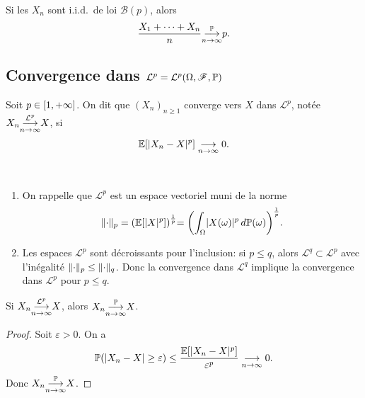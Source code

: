 \begin{example}
    Si les \(X_n\) sont i.i.d.\ de loi \(\mathcal B(p)\), alors
    \begin{equation*}
        \frac{X_1 + \cdots + X_n}{n} \underset{n\to\infty}{{\overset{\mathbb{P}}{\longrightarrow}}} p.
    \end{equation*}
\end{example}

\subsection{Convergence dans \(\mathcal L^p = \mathcal L^p(\Omega, \mathscr{F}, \mathbb{P})\)} %

\begin{definition}
    Soit \(p \in \mathopen{}\left[1, +\infty\right]\mathclose{}\). On dit que \({(X_n)}_{n\geq 1}\)
    converge vers \(X\) dans \(\mathcal L^p\), notée \(X_n \underset{n\to\infty}{{\overset{\mathcal{L}^{p}}{\longrightarrow}}} X\),
    si
    \begin{equation*}
        \mathbb{E}[\mathopen{}\left|X_n - X\right|\mathclose{}^p] \underset{n\to\infty}{\longrightarrow} 0.
    \end{equation*}
\end{definition}

\begin{remark}\,\\
    \begin{enumerate}
        \item 
        On rappelle que \(\mathcal L^p\) est un espace vectoriel
        muni de la norme
        \begin{equation*}
            \mathopen{}\left\|\cdot\right\|\mathclose{}_p = {\left(\mathbb{E}[\mathopen{}\left|X\right|\mathclose{}^p]\right)}^{\frac{1}{p}}
            {=\left(\int_\Omega \mathopen{}\left|X(\omega)\right|\mathclose{}^p \mathop{}\!{d} \mathbb{P}(\omega)\right)}^{\frac{1}{p}}.
        \end{equation*}

        \item Les espaces \(\mathcal L^p\) sont décroissants
        pour l'inclusion: si \(p \leq q\), alors \(\mathcal L^q \subset \mathcal L^p\)
        avec l'inégalité \(\mathopen{}\left\|\cdot\right\|\mathclose{}_p \leq \mathopen{}\left\|\cdot\right\|\mathclose{}_q\).
        Donc la convergence dans \(\mathcal L^q\) implique la
        convergence dans \(\mathcal L^p\) pour \(p \leq q\).
    \end{enumerate}
\end{remark}

\begin{proposition}
    Si \(X_n \underset{n\to\infty}{{\overset{\mathcal{L}^{p}}{\longrightarrow}}} X\), alors \(X_n \underset{n\to\infty}{{\overset{\mathbb{P}}{\longrightarrow}}} X\).
\end{proposition}

\begin{proof}
    Soit \(\varepsilon > 0\). On a
    \begin{equation*}
        \mathbb{P}(\mathopen{}\left|X_n - X\right|\mathclose{} \geq \varepsilon)
        \leq \frac{\mathbb{E}[\mathopen{}\left|X_n - X\right|\mathclose{}^p]}{\varepsilon^p} \underset{n\to\infty}{\longrightarrow} 0.
    \end{equation*}
    Donc \(X_n \underset{n\to\infty}{{\overset{\mathbb{P}}{\longrightarrow}}} X\).
\end{proof}

